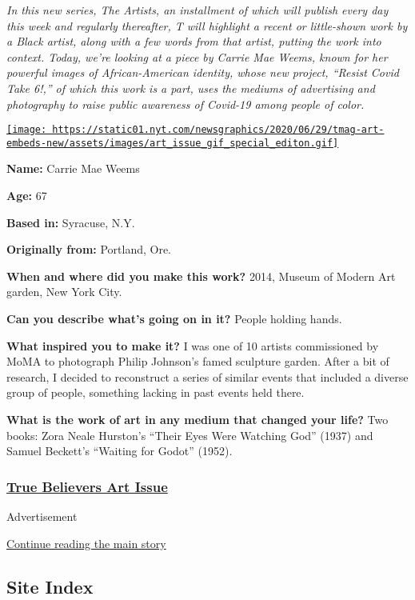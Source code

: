 \emph{In this new series, The Artists, an installment of which will
publish every day this week and regularly thereafter, T will highlight a
recent or little-shown work by a Black artist, along with a few words
from that artist, putting the work into context. Today, we're looking at
a piece by Carrie Mae Weems, known for her powerful images of
African-American identity, whose new project, ``Resist Covid Take 6!,''
of which this work is a part, uses the mediums of advertising and
photography to raise public awareness of Covid-19 among people of
color.}

\href{https://www.nytimes.com/issue/t-magazine/2020/07/02/true-believers-art-issue}{\texttt{[image: https://static01.nyt.com/newsgraphics/2020/06/29/tmag-art-embeds-new/assets/images/art\_issue\_gif\_special\_editon.gif]}}

\textbf{Name:} Carrie Mae Weems

\textbf{Age:} 67

\textbf{Based in:} Syracuse, N.Y.

\textbf{Originally from:} Portland, Ore.

\textbf{When and where did you make this work?} 2014, Museum of Modern
Art garden, New York City.

\textbf{Can you describe what's going on in it?} People holding hands.

\textbf{What inspired you to make it?} I was one of 10 artists
commissioned by MoMA to photograph Philip Johnson's famed sculpture
garden. After a bit of research, I decided to reconstruct a series of
similar events that included a diverse group of people, something
lacking in past events held there.

\textbf{What is the work of art in any medium that changed your life?}
Two books: Zora Neale Hurston's ``Their Eyes Were Watching God'' (1937)
and Samuel Beckett's ``Waiting for Godot'' (1952).

\hypertarget{true-believers-art-issue}{%
\subsubsection{\texorpdfstring{\href{https://www.nytimes.com/issue/t-magazine/2020/07/02/true-believers-art-issue}{True
Believers Art
Issue}}{True Believers Art Issue}}\label{true-believers-art-issue}}

Advertisement

\protect\hyperlink{after-bottom}{Continue reading the main story}

\hypertarget{site-index}{%
\subsection{Site Index}\label{site-index}}

